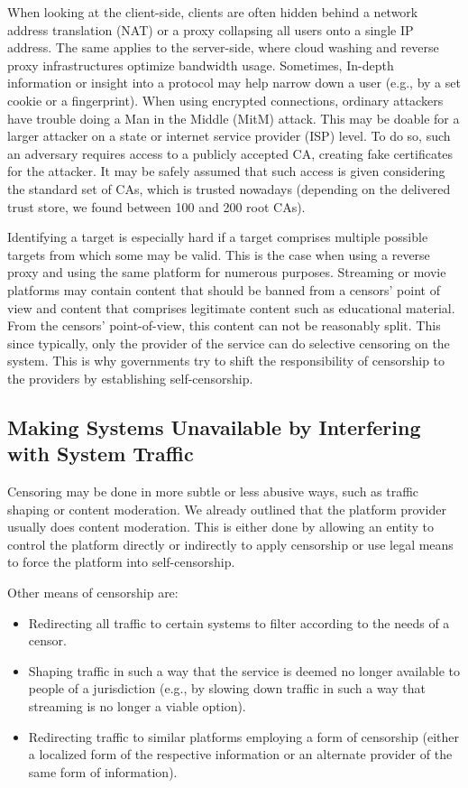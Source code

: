 When looking at the client-side, clients are often hidden behind a network address translation (NAT) or a proxy collapsing all users onto a single IP address. The same applies to the server-side, where cloud washing and reverse proxy infrastructures optimize bandwidth usage. Sometimes, In-depth information or insight into a protocol may help narrow down a user (e.g., by a set cookie or a fingerprint). When using encrypted connections, ordinary attackers have trouble doing a Man in the Middle (MitM) attack. This may be doable for a larger attacker on a state or internet service provider (ISP) level. To do so, such an adversary requires access to a publicly accepted CA, creating fake certificates for the attacker. It may be safely assumed that such access is given considering the standard set of CAs, which is trusted nowadays (depending on the delivered trust store, we found between 100 and 200 root CAs).

Identifying a target is especially hard if a target comprises multiple possible targets from which some may be valid. This is the case when using a reverse proxy and using the same platform for numerous purposes. Streaming or movie platforms may contain content that should be banned from a censors' point of view and content that comprises legitimate content such as educational material. From the censors' point-of-view, this content can not be reasonably split. This since typically, only the provider of the service can do selective censoring on the system. This is why governments try to shift the responsibility of censorship to the providers by establishing self-censorship. 

\subsection{Making Systems Unavailable by Interfering with System Traffic}
Censoring may be done in more subtle or less abusive ways, such as traffic shaping or content moderation. We already outlined that the platform provider usually does content moderation. This is either done by allowing an entity to control the platform directly or indirectly to apply censorship or use legal means to force the platform into self-censorship.

Other means of censorship are:
\begin{itemize}
	\item Redirecting all traffic to certain systems to filter according to the needs of a censor.
	\item Shaping traffic in such a way that the service is deemed no longer available to people of a jurisdiction (e.g., by slowing down traffic in such a way that streaming is no longer a viable option).
	\item Redirecting traffic to similar platforms employing a form of censorship (either a localized form of the respective information or an alternate provider of the same form of information).
\end{itemize}

